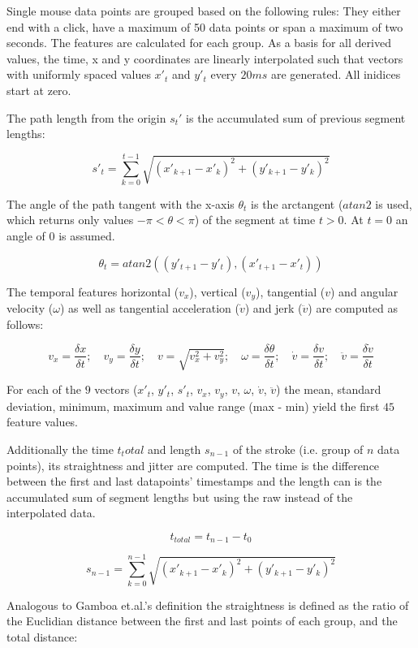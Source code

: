 \documentclass[
    fontsize=12pt,
    headings=small,
    parskip=half,           %
    bibliography=totoc,
    numbers=noenddot,       %
    open=any,               %
    final                   %
]{scrreprt}
\begin{document}
Single mouse data points are grouped based on the following rules: They either end with a click, have a maximum of 50 data points or span a maximum of two seconds. The features are calculated for each group. As a basis for all derived values, the time, x and y coordinates are linearly interpolated such that vectors with uniformly spaced values $x'_t$ and $y'_t$ every $20ms$ are generated. All inidices start at zero.

The path length from the origin $s_t'$ is the accumulated sum of previous segment lengths:

\[
s'_t = \sum_{k = 0}^{t - 1} \sqrt{(x'_{k+1} - x'_{k})^2 + (y'_{k+1} - y'_{k})^2}
\]

The angle of the path tangent with the x-axis $\theta_t$ is the arctangent ($atan2$ is used, which returns only values $-\pi < \theta < \pi$) of the segment at time $t > 0$. At $t=0$ an angle of $0$ is assumed.

\[
\theta_t = atan2( (y'_{t+1} - y'_{t}), (x'_{t+1} - x'_{t}) )
\]

The temporal features horizontal ($v_x$), vertical ($v_y$), tangential ($v$) and angular velocity ($\omega$) as well as tangential acceleration ($\dot{v}$) and jerk ($\ddot{v}$) are computed as follows:

\[
v_x = \frac{\delta x}{\delta t}; \quad
v_y = \frac{\delta y}{\delta t}; \quad
v = \sqrt{v_x^2 + v_y^2}; \quad
\omega = \frac{\delta \theta}{\delta t}; \quad
\dot{v} = \frac{\delta v}{\delta t}; \quad
\ddot{v} = \frac{\delta \dot{v}}{\delta t}
\]

For each of the $9$ vectors ($x'_t$, $y'_t$, $s'_t$, $v_x$, $v_y$, $v$, $\omega$, $\dot{v}$, $\ddot{v}$) the mean, standard deviation, minimum, maximum and value range (max - min) yield the first $45$ feature values.

Additionally the time $t_total$ and length $s_{n-1}$ of the stroke (i.e. group of $n$ data points), its straightness and jitter are computed. The time is the difference between the first and last datapoints' timestamps and the length can is the accumulated sum of segment lengths but using the raw instead of the interpolated data.

\[
t_{total} = t_{n-1} - t_0
\]

\[
s_{n-1} = \sum_{k = 0}^{n - 1} \sqrt{(x'_{k+1} - x'_{k})^2 + (y'_{k+1} - y'_{k})^2}
\]

Analogous to Gamboa et.al.'s definition\cite{GAMBOA2004} the straightness is defined as the ratio of the Euclidian distance between the first and last points of each group, and the total distance:
\end{document}
